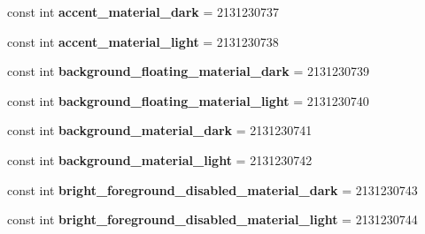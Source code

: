 \begin{DoxyCompactItemize}
\item 
\hypertarget{classClient_1_1Droid_1_1Resource_1_1Color_ac897fe7e64b2ce173e643cca4c9977d5}{}const int {\bfseries accent\+\_\+material\+\_\+dark} = 2131230737\label{classClient_1_1Droid_1_1Resource_1_1Color_ac897fe7e64b2ce173e643cca4c9977d5}

\item 
\hypertarget{classClient_1_1Droid_1_1Resource_1_1Color_abc47995d106bbc65ed5eef760cd3501e}{}const int {\bfseries accent\+\_\+material\+\_\+light} = 2131230738\label{classClient_1_1Droid_1_1Resource_1_1Color_abc47995d106bbc65ed5eef760cd3501e}

\item 
\hypertarget{classClient_1_1Droid_1_1Resource_1_1Color_a7a9120dd8c9b9625ddf06771806253ca}{}const int {\bfseries background\+\_\+floating\+\_\+material\+\_\+dark} = 2131230739\label{classClient_1_1Droid_1_1Resource_1_1Color_a7a9120dd8c9b9625ddf06771806253ca}

\item 
\hypertarget{classClient_1_1Droid_1_1Resource_1_1Color_ac5dabaa4d72ecdcfb91600da200b7e00}{}const int {\bfseries background\+\_\+floating\+\_\+material\+\_\+light} = 2131230740\label{classClient_1_1Droid_1_1Resource_1_1Color_ac5dabaa4d72ecdcfb91600da200b7e00}

\item 
\hypertarget{classClient_1_1Droid_1_1Resource_1_1Color_a590b0d54caf2fa6ac13f959c8dd03079}{}const int {\bfseries background\+\_\+material\+\_\+dark} = 2131230741\label{classClient_1_1Droid_1_1Resource_1_1Color_a590b0d54caf2fa6ac13f959c8dd03079}

\item 
\hypertarget{classClient_1_1Droid_1_1Resource_1_1Color_ad591e4d0897933d0aa813f3dfc24e5c8}{}const int {\bfseries background\+\_\+material\+\_\+light} = 2131230742\label{classClient_1_1Droid_1_1Resource_1_1Color_ad591e4d0897933d0aa813f3dfc24e5c8}

\item 
\hypertarget{classClient_1_1Droid_1_1Resource_1_1Color_a5e98f1345b3714039edafe8b024d53fc}{}const int {\bfseries bright\+\_\+foreground\+\_\+disabled\+\_\+material\+\_\+dark} = 2131230743\label{classClient_1_1Droid_1_1Resource_1_1Color_a5e98f1345b3714039edafe8b024d53fc}

\item 
\hypertarget{classClient_1_1Droid_1_1Resource_1_1Color_a4fad2b62431c983dff5ab093fe693da6}{}const int {\bfseries bright\+\_\+foreground\+\_\+disabled\+\_\+material\+\_\+light} = 2131230744\label{classClient_1_1Droid_1_1Resource_1_1Color_a4fad2b62431c983dff5ab093fe693da6}


\end{DoxyCompactItemize}
